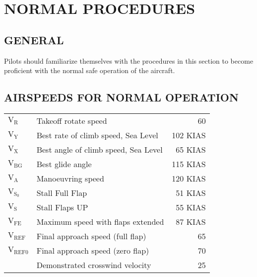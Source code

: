 \chapter{NORMAL PROCEDURES}
\vspace{\minitocspacebefore}
\minitoc
\cleardoublepage

\section{GENERAL}

Pilots should familiarize themselves with the procedures in this section
to become proficient with the normal safe operation of the aircraft.

\section{AIRSPEEDS FOR NORMAL OPERATION}

\begin{center}\begin{tabular}{llr}
$\mathrm{V_{R}}$&
Takeoff rotate speed&
60\tabularnewline
$\mathrm{V_{Y}}$ &
Best rate of climb speed, Sea Level&
102 KIAS\tabularnewline
$\mathrm{V_{X}}$ &
Best angle of climb speed, Sea Level&
65 KIAS\tabularnewline
$\mathrm{V_{BG}}$&
Best glide angle&
115 KIAS\tabularnewline
$\mathrm{V_{A}}$ &
Manoeuvring speed&
120 KIAS\tabularnewline
$\mathrm{V_{S_{0}}}$ &
Stall Full Flap&
51 KIAS\tabularnewline
$\mathrm{V_{S}}$ &
Stall Flaps UP&
55 KIAS\tabularnewline
$\mathrm{V_{FE}}$ &
Maximum speed with flaps extended &
87 KIAS\tabularnewline
$\mathrm{V_{REF}}$ &
Final approach speed (full flap)&
65\tabularnewline
$\mathrm{V_{REF0}}$ &
Final approach speed (zero flap)&
70\tabularnewline
&
Demonstrated crosswind velocity&
25\tabularnewline
\end{tabular}\end{center}

%

